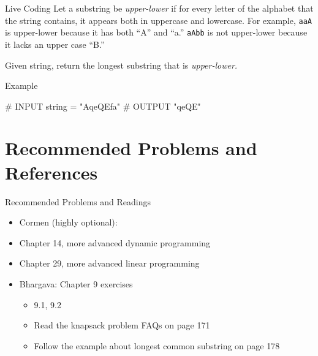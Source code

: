 \documentclass[
  ignorenonframetext,
]{beamer}
\newenvironment{Shaded}{\begin{snugshade}}{\end{snugshade}}
\newcommand{\CommentTok}[1]{\textcolor[rgb]{0.37,0.37,0.37}{#1}}
\newcommand{\NormalTok}[1]{\textcolor[rgb]{0.00,0.23,0.31}{#1}}
\newcommand{\OperatorTok}[1]{\textcolor[rgb]{0.37,0.37,0.37}{#1}}
\newcommand{\StringTok}[1]{\textcolor[rgb]{0.13,0.47,0.30}{#1}}
\begin{document}
\begin{frame}[fragile]{Live Coding}
\protect\hypertarget{live-coding}{}
Let a substring be \emph{upper-lower} if for every letter of the
alphabet that the string contains, it appears both in uppercase and
lowercase. For example, \texttt{aaA} is upper-lower because it has both
``A'' and ``a.'' \texttt{aAbb} is not upper-lower because it lacks an
upper case ``B.''

Given string, return the longest substring that is \emph{upper-lower.}

\begin{block}{Example}
\protect\hypertarget{example}{}
\begin{Shaded}
\begin{Highlighting}[]
\CommentTok{\# INPUT}
\NormalTok{string }\OperatorTok{=} \StringTok{"AqeQEfa"}
\CommentTok{\# OUTPUT}
\CommentTok{"qeQE"}
\end{Highlighting}
\end{Shaded}
\end{block}
\end{frame}

\hypertarget{recommended-problems-and-references}{%
\section{Recommended Problems and
References}\label{recommended-problems-and-references}}

\begin{frame}{Recommended Problems and Readings}
\protect\hypertarget{recommended-problems-and-readings}{}
\begin{itemize}
\item
  Cormen (highly optional):
\item
  Chapter 14, more advanced dynamic programming
\item
  Chapter 29, more advanced linear programming
\item
  Bhargava: Chapter 9 exercises

  \begin{itemize}
  \item
    9.1, 9.2
  \item
    Read the knapsack problem FAQs on page 171
  \item
    Follow the example about longest common substring on page 178
  \end{itemize}
\end{itemize}
\end{frame}
\end{document}
